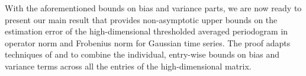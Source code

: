 \iffalse
$\xi_j = (1/\sqrt{n})(1, e^{i\omega_j}, e^{2i\omega_j}, \ldots, e^{i(n-1)\omega_j})^\top$, $j \in F_n$, is an orthogonal basis of $\mathbb{C}^n$ [verify indices]. $(r,s)^{th}$ entry of averaged periodogram takes the form (modulo division by $2\pi (2m+1)$)
\begin{equation*}
    e_r^\top \mathcal{X}^\top \left(\sum_{|\ell| \le m} \xi_j \xi_j^\top \right) \mathcal{X} e_s.
\end{equation*}
In order to use modified Hanson-Wright, we need to understand rank and spectral norm of the matrix $\sum_{|\ell| \le m} \xi_\ell \xi_\ell^\top$. This is a projection matrix (a vector space over field $\mathbb{C}$ with rank $2m+1$, so its spectral norm is bounded above by $1$.
\fi





With the aforementioned bounds on bias and variance parts, we are now ready to present our main result that provides non-asymptotic upper bounds on the estimation error of the high-dimensional thresholded averaged periodogram in operator norm and Frobenius norm for Gaussian time series. The proof adapts techniques of \citet{bickel2008covariance} and \citet{rothman2009generalized} to combine the individual, entry-wise bounds on bias and variance terms across all the entries of the high-dimensional matrix.

